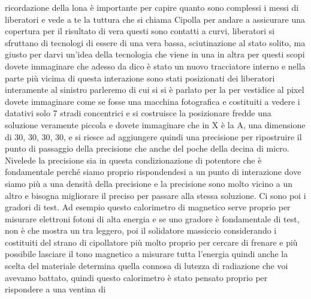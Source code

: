 ricordazione della lona è importante per capire quanto sono complessi i messi di liberatori e vede a te la tuttura che si chiama Cipolla per andare a assicurare una copertura per il risultato di vera questi sono contatti a curvi, liberatori si sfruttano di tecnologi di essere di una vera bassa, sciutinazione al stato solito, ma giusto per darvi un'idea della tecnologia che viene in una in altra per questi scopi dovete immaginare che adesso da dico è stato un nuovo tracciatore interno e nella parte più vicima di questa interazione sono stati posizionati dei liberatori interamente al sinistro parleremo di cui si si è parlato per la per vestidice al pixel dovete immaginare come se fosse una macchina fotografica e costituiti a vedere i datativi solo 7 stradi concentrici e si costruisce la posizionare fredde una soluzione veramente piccola e dovete immaginare che in X è la A, una dimensione di 30, 30, 30, 30, e si riesce ad aggiungere quindi una precisione per ripostruire il punto di passaggio della precisione che anche del poche della decina di micro. Nivelede la precisione sia in questa condizionazione di potentore che è fondamentale perché siamo proprio rispondendesi a un punto di interazione dove siamo più a una densità della precisione e la precisione sono molto vicino a un altro e bisogna migliorare il preciso per passare alla stessa soluzione. Ci sono poi i gradori di test. Ad esempio questo calorimetro di magnetico serve proprio per misurare elettroni fotoni di alta energia e se uno gradore è fondamentale di test, non è che mostra un tra leggero, poi il solidatore massiccio considerando i costituiti del strano di cipollatore più molto proprio per cercare di frenare e più possibile lasciare il tono magnetico a misurare tutta l'energia quindi anche la scelta del materiale determina quella connosa di lutezza di radiazione che voi avevamo battato, quindi questo calorimetro è stato pensato proprio per rispondere a una ventina di 

